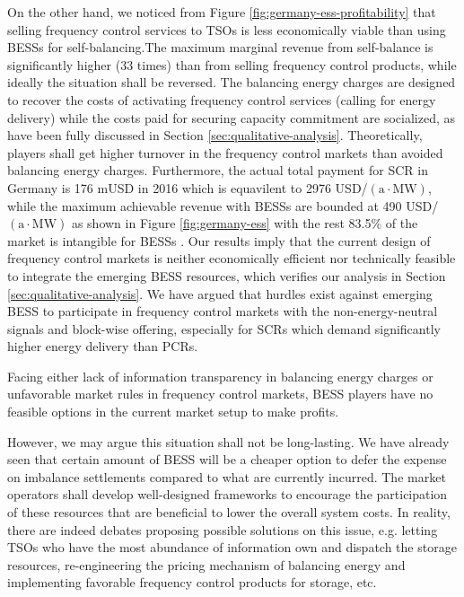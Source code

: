 On the other hand, we noticed from Figure \ref{fig:germany-ess-profitability} that selling frequency control services to TSOs is less economically viable than using BESSs for self-balancing.The maximum marginal revenue from self-balance is significantly higher (33 times) than from selling frequency control products, while ideally the situation shall be reversed. The balancing energy charges are designed to recover the costs of activating frequency control services (calling for energy delivery) while the costs paid for securing capacity commitment are socialized, as have been fully discussed in Section \ref{sec:qualitative-analysis}. Theoretically, players shall get higher turnover in the frequency control markets than avoided balancing energy charges. Furthermore, the actual total payment for SCR in Germany is 176 mUSD in 2016 which is equavilent to \num{2976} USD/$(\text{a} \cdot \text{MW})$, while the maximum achievable revenue with BESSs are bounded at \num{490} USD/$(\text{a} \cdot \text{MW})$ as shown in Figure \ref{fig:germany-ess} with the rest 83.5\% of the market is intangible for BESSs . Our results imply that the current design of frequency control markets is neither economically efficient nor technically feasible to integrate the emerging BESS resources, which verifies our analysis in Section \ref{sec:qualitative-analysis}. We have argued that hurdles exist against emerging BESS to participate in frequency control markets with the non-energy-neutral signals and block-wise offering, especially for SCRs which demand significantly higher energy delivery than PCRs.

Facing either lack of information transparency in balancing energy charges or unfavorable market rules in frequency control markets, BESS players have no feasible options in the current market setup to make profits.

However, we may argue this situation shall not be long-lasting. We have already seen that certain amount of BESS will be a cheaper option to defer the expense on imbalance settlements compared to what are currently incurred. The market operators shall develop well-designed frameworks to encourage the participation of these resources that are beneficial to lower the overall system costs. In reality, there are indeed debates proposing possible solutions on this issue, e.g. letting TSOs who have the most abundance of information own and dispatch the storage resources\cite{He2012}, re-engineering the pricing mechanism of balancing energy\cite{Wartsila2014} and implementing favorable frequency control products for storage\cite{Megel2017}, etc.

